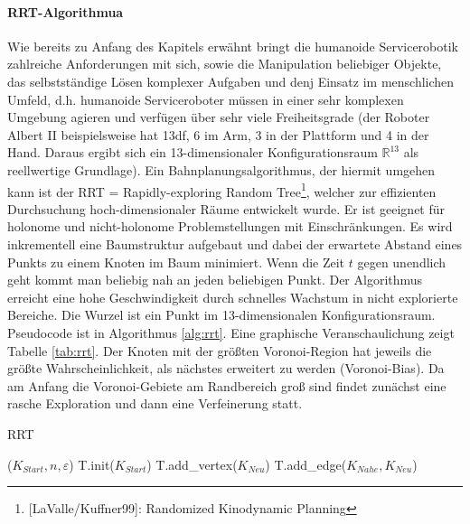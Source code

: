 \paragraph*{RRT-Algorithmua}
Wie bereits zu Anfang des Kapitels erwähnt bringt die humanoide Servicerobotik zahlreiche Anforderungen mit sich, sowie die Manipulation beliebiger Objekte, das selbstständige Lösen komplexer Aufgaben und denj Einsatz im menschlichen Umfeld, d.h. humanoide Serviceroboter müssen in einer sehr komplexen Umgebung agieren und verfügen über sehr viele Freiheitsgrade (der Roboter Albert II beispielsweise hat 13df,  6 im Arm, 3 in der Plattform und 4 in der Hand. Daraus ergibt sich ein 13-dimensionaler Konfigurationsraum $\mathbb{R}^{13}$ als reellwertige Grundlage).
Ein Bahnplanungsalgorithmus, der hiermit umgehen kann ist der RRT = Rapidly-exploring Random Tree\footnote{[LaValle/Kuffner99]: Randomized Kinodynamic
Planning}, welcher zur effizienten Durchsuchung hoch-dimensionaler Räume entwickelt wurde. Er ist geeignet für holonome und nicht-holonome Problemstellungen mit Einschränkungen. Es wird inkrementell eine Baumstruktur aufgebaut und dabei der erwartete Abstand eines Punkts zu einem Knoten im Baum minimiert. Wenn die Zeit $t$ gegen unendlich geht kommt man beliebig nah an jeden beliebigen Punkt. Der Algorithmus erreicht eine hohe Geschwindigkeit durch schnelles Wachstum in nicht explorierte Bereiche. Die Wurzel ist ein Punkt im 13-dimensionalen Konfigurationsraum. Pseudocode ist in Algorithmus \ref{alg:rrt}. 
Eine graphische Veranschaulichung zeigt Tabelle \ref{tab:rrt}.
Der Knoten mit der größten Voronoi-Region hat jeweils die größte Wahrscheinlichkeit, als nächstes erweitert zu werden (Voronoi-Bias). Da am Anfang die Voronoi-Gebiete am
Randbereich groß sind findet zunächst eine rasche Exploration und dann eine Verfeinerung statt.
\begin{algorithm}
  \caption{RRT
    \label{alg:rrt}}
  \begin{algorithmic}[1]
    ($K_{Start}, n, \varepsilon$)
      \State T.init($K_{Start}$) 
         
         
         
        \State T.add\_vertex($K_{Neu}$)
        \State T.add\_edge($K_{Nahe}, K_{Neu}$)
      \EndFor
      \State {}
  \end{algorithmic}
\end{algorithm}


